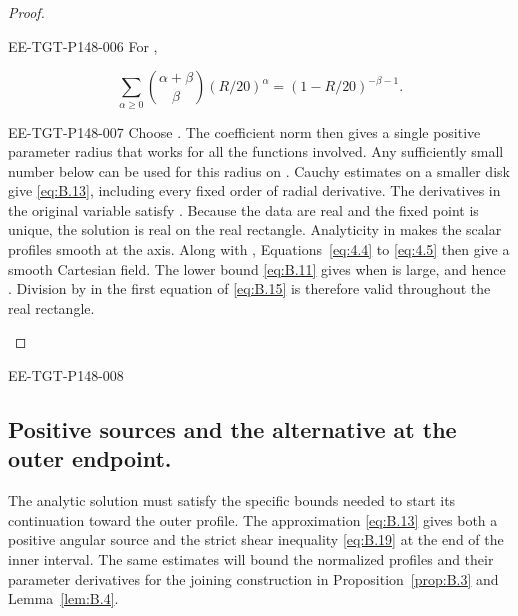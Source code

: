 \begin{proof}
\begin{EESegment}{EE-TGT-P148-006}
For ,
\end{EESegment}
\begin{equation*}
  \sum_{\alpha\geq0}\binom{\alpha+\beta}{\beta}(R/20)^\alpha
  =(1-R/20)^{-\beta-1}.
\end{equation*}
\begin{EESegment}{EE-TGT-P148-007}
Choose . The coefficient norm then gives a single positive parameter radius that works
for all the functions involved. Any sufficiently small number below
 can be used for this radius on
.
Cauchy estimates on a smaller  disk give \eqref{eq:B.13}, including every
fixed order of radial derivative. The derivatives in the original variable satisfy
. Because the data are real and the fixed
point is unique, the solution is real on the real rectangle. Analyticity in
 makes the scalar profiles smooth at the axis. Along with
, Equations~\eqref{eq:4.4} to \eqref{eq:4.5}
then give a smooth Cartesian field. The lower bound \eqref{eq:B.11} gives
 when  is large, and hence
. Division by  in the first equation of
\eqref{eq:B.15} is therefore valid throughout the real rectangle.
\end{EESegment}
\end{proof}

\begin{EESegment}{EE-TGT-P148-008}
\subsection{Positive sources and the alternative at the outer endpoint.}\label{sec:B.4}
The analytic solution must satisfy the specific bounds needed to start its continuation toward
the outer profile. The approximation \eqref{eq:B.13} gives both a positive angular source
 and the strict shear inequality \eqref{eq:B.19} at the end of the inner
interval. The same estimates will bound the normalized profiles and their parameter derivatives for
the joining construction in Proposition~\ref{prop:B.3} and Lemma~\ref{lem:B.4}.
\end{EESegment}

